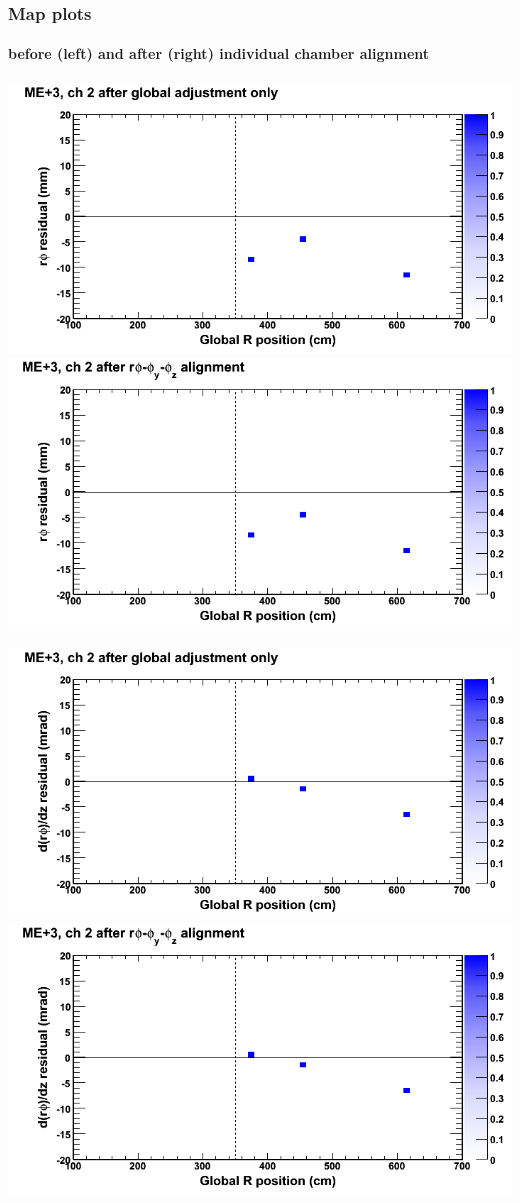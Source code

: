 \documentclass[compress]{beamer}
\begin{document}
\begin{frame}
\frametitle{Map plots}
\framesubtitle{before (left) and after (right) individual chamber alignment}
\includegraphics[width=0.5\linewidth]{ringmapplots_3dof/before_CSCvsr_mep3ch02_x.png} \includegraphics[width=0.5\linewidth]{ringmapplots_3dof/after_CSCvsr_mep3ch02_x.png}

\includegraphics[width=0.5\linewidth]{ringmapplots_3dof/before_CSCvsr_mep3ch02_dxdz.png} \includegraphics[width=0.5\linewidth]{ringmapplots_3dof/after_CSCvsr_mep3ch02_dxdz.png}
\end{frame}
\end{document}
